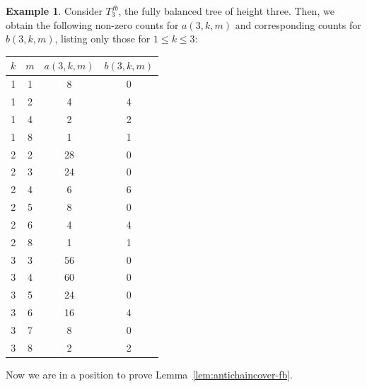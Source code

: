 \documentclass{amsart}
\theoremstyle{definition}
\newtheorem{example}[theorem]{Example}
\begin{document}
\begin{example}\label{ex:fully-balanced-antichains}
    Consider $T_3^{fb}$, the fully balanced tree of height three. Then, we obtain the following non-zero counts for $a(3,k,m)$ and corresponding counts for $b(3,k,m)$, listing only those for $1 \leq k \leq 3$:
    \begin{center}
        \begin{tabular}{c|c|c|c}
          $k$ & $m$ & $a(3,k,m)$ & $b(3,k,m)$ \\ \hline
          1 & 1 & 8 & 0\\
          1 & 2 & 4 & 4\\
          1 & 4 & 2 & 2 \\
          1 & 8 & 1 & 1 \\
          2 & 2 & 28 & 0\\
          2 & 3 & 24 & 0\\
          2 & 4 & 6 & 6 \\
          2 & 5 & 8 & 0\\
          2 & 6 & 4 & 4 \\
          2 & 8 & 1 & 1 \\
          3 & 3 & 56 & 0 \\
          3 & 4 & 60 & 0\\
          3 & 5 & 24 & 0 \\
          3 & 6 & 16 & 4 \\
          3 & 7 & 8 & 0\\
          3 & 8 & 2 & 2 \\
        \end{tabular}
    \end{center}
\end{example}

Now we are in a position to prove Lemma~\ref{lem:antichaincover-fb}. 
\end{document}
